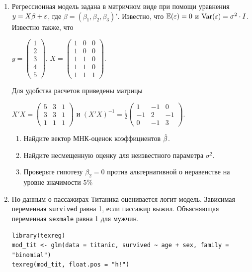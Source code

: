 \documentclass[12pt, a4paper]{article}
\begin{document}
\begin{enumerate}
\item Регрессионная модель  задана в матричном виде при помощи уравнения $y=X\beta+\varepsilon$, где $\beta=(\beta_1,\beta_2,\beta_3)'$.
Известно, что $\mathbb{E}(\varepsilon)=0$  и  $\operatorname{Var}(\varepsilon)=\sigma^2\cdot I$.
Известно также, что

$y=\left(
\begin{array}{c}
1\\
2\\
3\\
4\\
5
\end{array}\right)$,
$X=\left(\begin{array}{ccc}
1 & 0 & 0 \\
1 & 0 & 0 \\
1 & 1 & 0 \\
1 & 1 & 0 \\
1 & 1 & 1
\end{array}\right)$.


Для удобства расчетов приведены матрицы


$X'X=\left(
\begin{array}{ccc}
5 & 3 & 1\\
3 & 3 & 1\\
1 & 1 & 1
\end{array}\right)$ и $(X'X)^{-1}=\frac{1}{2}\left(
\begin{array}{ccc}
1 & -1 & 0 \\
-1 & 2 & -1 \\
0 & -1 & 3
\end{array}\right)$.

\begin{enumerate}
\item Найдите вектор МНК-оценок коэффициентов $\hat{\beta}$.
\item Найдите несмещенную оценку для неизвестного параметра $\sigma^2$.
\item Проверьте гипотезу $\beta_2=0$ против альтернативной о неравенстве на уровне значимости 5\%

\end{enumerate}




\item По данным о пассажирах Титаника оценивается логит-модель. Зависимая переменная \verb|survived| равна 1, если пассажир выжил. Объясняющая переменная \verb|sexmale| равна 1 для  мужчин.

\begin{verbatim}
library(texreg)
mod_tit <- glm(data = titanic, survived ~ age + sex, family = "binomial")
texreg(mod_tit, float.pos = "h!")
\end{verbatim}



\end{enumerate}
\end{document}

